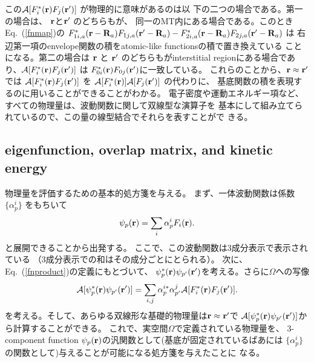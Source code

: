 \documentclass[twocolumn,showpacs,preprintnumbers,amsmath,amssymb,floatfix]{revtex4-1}
\newcommand{\bfr}{{\bf r}}
\newcommand{\bfR}{{\bf R}}
\def\calR{{\cal A}}
\newcommand{\req}[1]{\mbox{Eq.~\!(\ref{#1})}}
\begin{document}
この$\calR[F^*_i(\bfr)F_{j}(\bfr')]$ が物理的に意味があるのは以
下の二つの場合である。第一の場合は、 $\bfr$と$\bfr'$ のどちらもが、
同一のMT内にある場合である。このとき\req{fnmap}の
$F^*_{1i,a}(\bfr-\bfR_a) F_{1j,a}(\bfr'-\bfR_a)  
-F^*_{2i,a}(\bfr-\bfR_a) F_{2j,a}(\bfr'-\bfR_a)$ は
右辺第一項のenvelope関数の積をatomic-like functionsの積で置き換えている
ことになる。第二の場合は $\bfr$ と $\bfr'$ のどちらもがinterstitial
regionにある場合であり、$\calR[F^*_i(\bfr)F_{j}(\bfr')]$ は
$F^*_{0i}(\bfr)F_{0j}(\bfr')$に一致している。
これらのことから、$\bfr \approx \bfr'$では
$\calR[F^*_i(\bfr)F_{j}(\bfr')]$ を
$\calR[F^*_i(\bfr)]\calR[F_{j}(\bfr')]$ の代わりに、
基底関数の積を表現するのに用いることができることがわかる。
電子密度や運動エネルギー項など、すべての物理量は、波動関数に関して双線型な演算子を
基本にして組み立てられているので、この量の線型結合でそれらを表すことがで
きる。

\subsection{eigenfunction, overlap matrix, and kinetic energy}
\label{sec:eigenfunction}
物理量を評価するための基本的処方箋を与える。
まず、一体波動関数は係数$\{\alpha_{p}^i\}$ をもちいて
\begin{eqnarray}
\psi_p(\bfr) = \sum_i \alpha_p^i F_i(\bfr).
\label{eq:eig}
\end{eqnarray}
と展開できることから出発する。
ここで、この波動関数は3成分表示で表示されている
（3成分表示での和はその成分ごとにとられる）。
次に、\req{fnproduct}の定義にもとづいて、
$\psi^*_p(\bfr)\psi_{p'}(\bfr')$を考える。さらに$\Omega$への写像
\begin{eqnarray}
\calR[\psi^*_p(\bfr)\psi_{p'}(\bfr')]= 
\sum_{i,j} \alpha_{p}^{i*} \alpha_{p'}^j \calR[F^*_i(\bfr) F_j(\bfr')].
\label{eq:phiphi}
\end{eqnarray}
を考える。そして、あらゆる双線形な基礎的物理量は$\bfr \approx \bfr'$で
$\calR[\psi^*_p(\bfr)\psi_{p'}(\bfr')]$から計算することができる。
これで、実空間$\Omega$で定義されている物理量を、
3-component function ${\psi_p}(\bfr)$の汎関数として(基底が固定されているばあには
$\{\alpha_{p}^i\}$の関数として)与えることが可能になる処方箋を与えたことに
なる。
\end{document}
